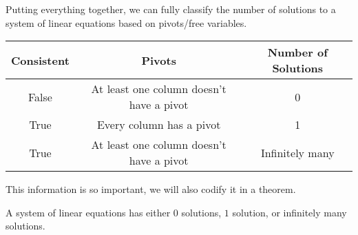 	Putting everything together, we can fully classify the number of solutions to a system of linear equations
	based on pivots/free variables.

	\begin{center}
		\begin{tabular}{c|c|c}
			Consistent & Pivots & Number of Solutions\\
			\hline
			False & At least one column doesn't have a pivot & 0\\
			True & Every column has a pivot & 1\\
			True & At least one column doesn't have a pivot & Infinitely many\\
		\end{tabular}
	\end{center}

	This information is so important, we will also codify it in a theorem.

	\begin{theorem}
		A system of linear equations has either $0$ solutions, $1$ solution, or infinitely many solutions.
	\end{theorem}
